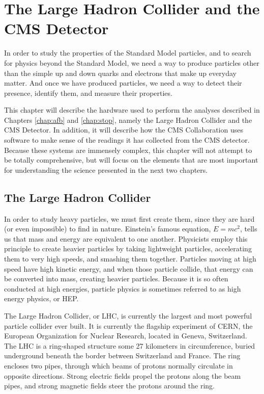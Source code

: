 \chapter{The Large Hadron Collider and the CMS Detector}
\label{chap:hardware}

In order to study the properties of the Standard Model particles, and
to search for physics beyond the Standard Model, we need a way to
produce particles other than the simple up and down quarks and
electrons that make up everyday matter. And once we have produced
particles, we need a way to detect their presence, identify them, and
measure their properties.

This chapter will describe the hardware used to perform
the analyses described in Chapters \ref{chap:afb} and \ref{chap:stop},
namely the Large Hadron Collider and the CMS Detector. In addition, it
will describe how the CMS Collaboration uses software to make sense of
the readings it has collected from the CMS detector. Because these
systems are immensely complex, this chapter will not attempt to be
totally comprehensive, but will focus on the elements that are most
important for understanding the science presented in the next two
chapters. %

\section{The Large Hadron Collider}
\label{sec:lhc}

In order to study heavy particles, we must first create them, since
they are hard (or even impossible) to find in nature.
Einstein's famous equation, $E = mc^2$, tells us that mass and energy
are equivalent to one another. Physicists employ this principle to create
heavier particles by taking lightweight particles, accelerating them to very high
speeds, and smashing them together. Particles moving at high speed
have high kinetic energy, and when those particle collide, that energy
can be converted into mass, creating heavier particles. Because it is
so often conducted at high energies, particle physics is sometimes
referred to as high energy physics, or HEP.

The Large Hadron Collider, or LHC, is currently the largest and most
powerful particle collider ever built. %
It is currently the flagship experiment of CERN, the European Organization
for Nuclear Research, located in Geneva, Switzerland.
The LHC is a ring-shaped structure some 27 kilometers in circumference,
buried underground beneath the border between Switzerland and
France. The ring encloses two pipes, through which beams of
protons normally circulate in opposite directions. Strong electric fields
propel the protons along the beam pipes, and strong magnetic fields
steer the protons around the ring.

